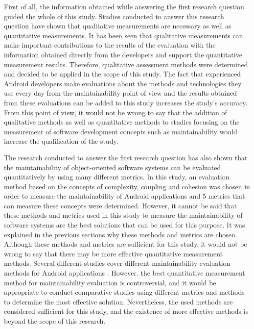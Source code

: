 First of all, the information obtained while answering the first research question guided the whole of this study. Studies conducted to answer this research question have shown that qualitative measurements are necessary as well as quantitative measurements. It has been seen that qualitative measurements can make important contributions to the results of the evaluation with the information obtained directly from the developers and support the quantitative measurement results. Therefore, qualitative assessment methods were determined and decided to be applied in the scope of this study. The fact that experienced Android developers make evaluations about the methods and technologies they use every day from the maintainability point of view and the results obtained from these evaluations can be added to this study increases the study's accuracy. From this point of view, it would not be wrong to say that the addition of qualitative methods as well as quantitative methods to studies focusing on the measurement of software development concepts such as maintainability would increase the qualification of the study.

The research conducted to answer the first research question has also shown that the maintainability of object-oriented software systems can be evaluated quantitatively by using many different metrics. In this study, an evaluation method based on the concepts of complexity, coupling and cohesion was chosen in order to measure the maintainability of Android applications and 5 metrics that can measure these concepts were determined. However, it cannot be said that these methods and metrics used in this study to measure the maintainability of software systems are the best solutions that can be used for this purpose. It was explained in the previous sections why these methods and metrics are chosen. Although these methods and metrics are sufficient for this study, it would not be wrong to say that there may be more effective quantitative measurement methods. Several different studies cover different maintainability evaluation methods for Android applications \cite{43,34}. However. the best quantitative measurement method for maintainability evaluation is controversial, and it would be appropriate to conduct comparative studies using different metrics and methods to determine the most effective solution. Nevertheless, the used methods are considered sufficient for this study, and the existence of more effective methods is beyond the scope of this research.